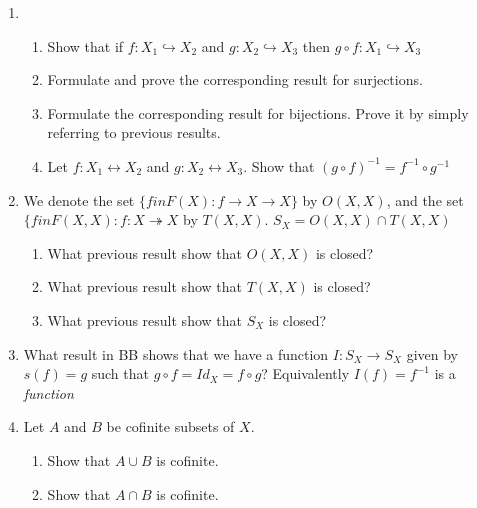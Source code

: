 \documentclass[11pt]{article}
\begin{document}
\begin{enumerate}
\newpage
\item
\begin{enumerate}
\item Show that if $f :X_1 \hookrightarrow X_2$ and $g :X_2 \hookrightarrow X_3$ then $g \circ f: X_1 \hookrightarrow X_3$\\
\item Formulate and prove the corresponding result for surjections.\\
\item Formulate the corresponding result for bijections. Prove it by simply referring to previous results.
\item Let $f :X_1 \leftrightarrow X_2$ and $g :X_2 \leftrightarrow X_3$.  Show that $(g \circ f)^{-1} = f^{-1} \circ g^{-1}$\\
\end{enumerate}


\newpage
\item We denote the set $\{f in F(X) : f \to X \to X\}$ by $O(X, X)$, and the set $\{f in F(X, X) : f : X \twoheadrightarrow X$ by $T(X, X)$.  $S_X = O(X,X) \cap T(X,X)$
\begin{enumerate}
\item What previous result show that $O(X, X)$ is closed?\\
\item What previous result show that $T(X, X)$ is closed?\\
\item What previous result show that $S_X$ is closed?\\
\end{enumerate}

\newpage
\item What result in BB shows that we have a function $I : S_X \to S_X$ given by $s(f) = g$ such that $g \circ f = Id_X = f \circ g$? Equivalently $I(f) = f^{-1}$ is a \emph{function}\\

\newpage
\item Let $A$ and $B$ be cofinite subsets of $X$.\\
\begin{enumerate}
\item Show that $A \cup B$ is cofinite.\\
\item Show that $A \cap B$ is cofinite.\\
\end{enumerate}


\end{enumerate}
\end{document}
